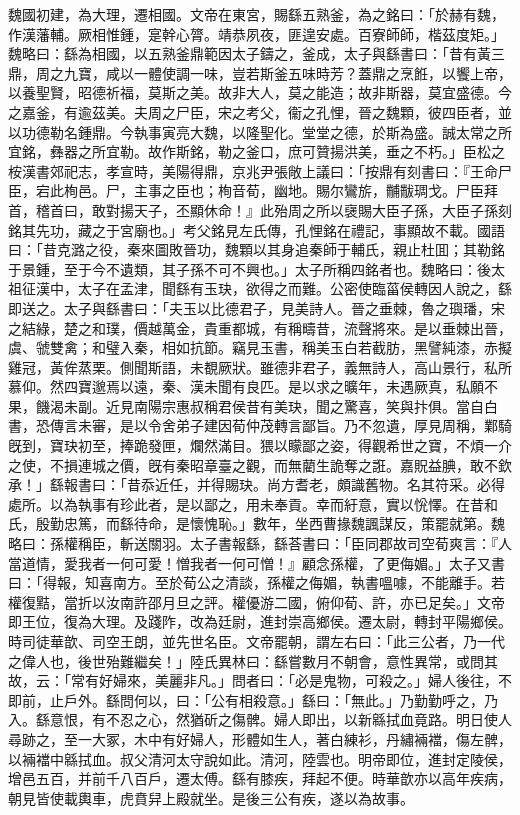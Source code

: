 \begin{pinyinscope}
魏國初建，為大理，遷相國。文帝在東宮，賜繇五熟釜，為之銘曰：「於赫有魏，作漢藩輔。厥相惟鍾，寔幹心膂。靖恭夙夜，匪遑安處。百寮師師，楷茲度矩。」魏略曰：繇為相國，以五熟釜鼎範因太子鑄之，釜成，太子與繇書曰：「昔有黃三鼎，周之九寶，咸以一體使調一味，豈若斯釜五味時芳？蓋鼎之烹餁，以饗上帝，以養聖賢，昭德祈福，莫斯之美。故非大人，莫之能造；故非斯器，莫宜盛德。今之嘉釜，有逾茲美。夫周之尸臣，宋之考父，衞之孔悝，晉之魏顆，彼四臣者，並以功德勒名鍾鼎。今執事寅亮大魏，以隆聖化。堂堂之德，於斯為盛。誠太常之所宜銘，彝器之所宜勒。故作斯銘，勒之釜口，庶可贊揚洪美，垂之不朽。」臣松之桉漢書郊祀志，孝宣時，美陽得鼎，京兆尹張敞上議曰：「按鼎有刻書曰：『王命尸臣，宕此栒邑。尸，主事之臣也；栒音荀，幽地。賜尔鸞旂，黼黻琱戈。尸臣拜首，稽首曰，敢對揚天子，丕顯休命！』此殆周之所以襃賜大臣子孫，大臣子孫刻銘其先功，藏之于宮廟也。」考父銘見左氏傳，孔悝銘在禮記，事顯故不載。國語曰：「昔克潞之役，秦來圖敗晉功，魏顆以其身追秦師于輔氏，親止杜囬；其勒銘于景鍾，至于今不遺類，其子孫不可不興也。」太子所稱四銘者也。魏略曰：後太祖征漢中，太子在孟津，聞繇有玉玦，欲得之而難。公密使臨菑侯轉因人說之，繇即送之。太子與繇書曰：「夫玉以比德君子，見美詩人。晉之垂棘，魯之璵璠，宋之結綠，楚之和璞，價越萬金，貴重都城，有稱疇昔，流聲將來。是以垂棘出晉，虞、虢雙禽；和璧入秦，相如抗節。竊見玉書，稱美玉白若截肪，黑譬純漆，赤擬雞冠，黃侔蒸栗。側聞斯語，未覩厥狀。雖德非君子，義無詩人，高山景行，私所慕仰。然四寶邈焉以遠，秦、漢未聞有良匹。是以求之曠年，未遇厥真，私願不果，饑渴未副。近見南陽宗惠叔稱君侯昔有美玦，聞之驚喜，笑與抃俱。當自白書，恐傳言未審，是以令舍弟子建因荀仲茂轉言鄙旨。乃不忽遺，厚見周稱，鄴騎旣到，寶玦初至，捧跪發匣，爛然滿目。猥以矇鄙之姿，得觀希世之寶，不煩一介之使，不損連城之價，旣有秦昭章臺之觀，而無藺生詭奪之誑。嘉貺益腆，敢不欽承！」繇報書曰：「昔忝近任，并得賜玦。尚方耆老，頗識舊物。名其符采。必得處所。以為執事有珍此者，是以鄙之，用未奉貢。幸而紆意，實以恱懌。在昔和氏，殷勤忠篤，而繇待命，是懷愧恥。」數年，坐西曹掾魏諷謀反，策罷就第。魏略曰：孫權稱臣，斬送關羽。太子書報繇，繇荅書曰：「臣同郡故司空荀爽言：『人當道情，愛我者一何可愛！憎我者一何可憎！』顧念孫權，了更侮媚。」太子又書曰：「得報，知喜南方。至於荀公之清談，孫權之侮媚，執書嗢噱，不能離手。若權復黠，當折以汝南許邵月旦之評。權優游二國，俯仰荀、許，亦已足矣。」文帝即王位，復為大理。及踐阼，改為廷尉，進封崇高鄉侯。遷太尉，轉封平陽鄉侯。時司徒華歆、司空王朗，並先世名臣。文帝罷朝，謂左右曰：「此三公者，乃一代之偉人也，後世殆難繼矣！」陸氏異林曰：繇嘗數月不朝會，意性異常，或問其故，云：「常有好婦來，美麗非凡。」問者曰：「必是鬼物，可殺之。」婦人後往，不即前，止戶外。繇問何以，曰：「公有相殺意。」繇曰：「無此。」乃勤勤呼之，乃入。繇意恨，有不忍之心，然猶斫之傷髀。婦人即出，以新緜拭血竟路。明日使人尋跡之，至一大冢，木中有好婦人，形體如生人，著白練衫，丹繡裲襠，傷左髀，以裲襠中緜拭血。叔父清河太守說如此。清河，陸雲也。明帝即位，進封定陵侯，增邑五百，并前千八百戶，遷太傅。繇有膝疾，拜起不便。時華歆亦以高年疾病，朝見皆使載輿車，虎賁舁上殿就坐。是後三公有疾，遂以為故事。


\end{pinyinscope}
